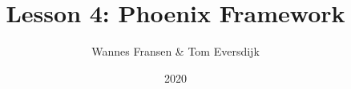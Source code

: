 \documentclass{beamer}
\title{Lesson 4: Phoenix Framework}
\author{Wannes Fransen \& Tom Eversdijk}
\institute{UC Leuven}
\date{2020}
\begin{document}
\frame{\titlepage}







\end{document}
